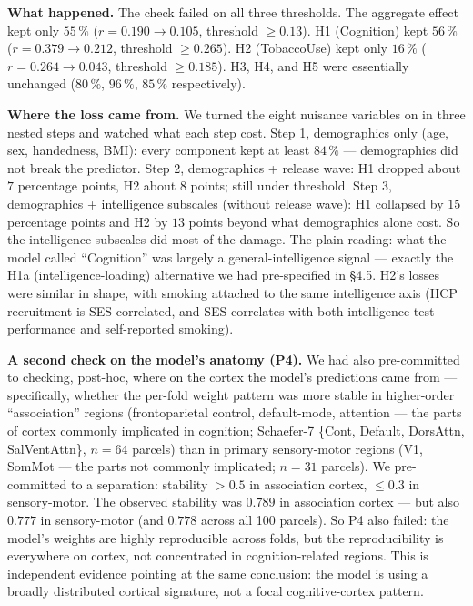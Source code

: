 \documentclass[11pt,letterpaper]{report}
\begin{document}
\textbf{What happened.} The check failed on all three thresholds. The aggregate effect kept only $55\,\%$ ($r = 0.190 \rightarrow 0.105$, threshold $\ge 0.13$). H1 (Cognition) kept $56\,\%$ ($r = 0.379 \rightarrow 0.212$, threshold $\ge 0.265$). H2 (TobaccoUse) kept only $16\,\%$ ($r = 0.264 \rightarrow 0.043$, threshold $\ge 0.185$). H3, H4, and H5 were essentially unchanged ($80\,\%$, $96\,\%$, $85\,\%$ respectively).

\textbf{Where the loss came from.} We turned the eight nuisance variables on in three nested steps and watched what each step cost. Step 1, demographics only (age, sex, handedness, BMI): every component kept at least $84\,\%$ --- demographics did not break the predictor. Step 2, demographics + release wave: H1 dropped about $7$ percentage points, H2 about $8$ points; still under threshold. Step 3, demographics + intelligence subscales (without release wave): H1 collapsed by $15$ percentage points and H2 by $13$ points beyond what demographics alone cost. So the intelligence subscales did most of the damage. The plain reading: what the model called ``Cognition'' was largely a general-intelligence signal --- exactly the H1a (intelligence-loading) alternative we had pre-specified in \S4.5. H2's losses were similar in shape, with smoking attached to the same intelligence axis (HCP recruitment is SES-correlated, and SES correlates with both intelligence-test performance and self-reported smoking).

\textbf{A second check on the model's anatomy (P4).} We had also pre-committed to checking, post-hoc, where on the cortex the model's predictions came from --- specifically, whether the per-fold weight pattern was more stable in higher-order ``association'' regions (frontoparietal control, default-mode, attention --- the parts of cortex commonly implicated in cognition; Schaefer-7 \{Cont, Default, DorsAttn, SalVentAttn\}, $n = 64$ parcels) than in primary sensory-motor regions (V1, SomMot --- the parts not commonly implicated; $n = 31$ parcels). We pre-committed to a separation: stability $> 0.5$ in association cortex, $\le 0.3$ in sensory-motor. The observed stability was $0.789$ in association cortex --- but also $0.777$ in sensory-motor (and $0.778$ across all 100 parcels). So P4 also failed: the model's weights are highly reproducible across folds, but the reproducibility is everywhere on cortex, not concentrated in cognition-related regions. This is independent evidence pointing at the same conclusion: the model is using a broadly distributed cortical signature, not a focal cognitive-cortex pattern.
\end{document}
